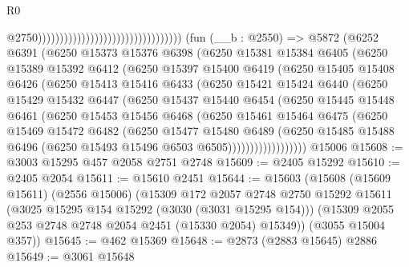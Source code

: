 \begin{lexlean}{R0}
\begin{coremodule}
                                                                      @2750)))))))))))))))))))))))))))))))))
    (fun (__b : @2550) =>
    @5872
      (@6252
        @6391
        (@6250
          @15373
          @15376
          @6398
          (@6250
            @15381
            @15384
            @6405
            (@6250
              @15389
              @15392
              @6412
              (@6250
                @15397
                @15400
                @6419
                (@6250
                  @15405
                  @15408
                  @6426
                  (@6250
                    @15413
                    @15416
                    @6433
                    (@6250
                      @15421
                      @15424
                      @6440
                      (@6250
                        @15429
                        @15432
                        @6447
                        (@6250
                          @15437
                          @15440
                          @6454
                          (@6250
                            @15445
                            @15448
                            @6461
                            (@6250
                              @15453
                              @15456
                              @6468
                              (@6250
                                @15461
                                @15464
                                @6475
                                (@6250
                                  @15469
                                  @15472
                                  @6482
                                  (@6250
                                    @15477
                                    @15480
                                    @6489
                                    (@6250
                                      @15485
                                      @15488
                                      @6496
                                      (@6250 @15493 @15496 @6503 @6505))))))))))))))))))
    @15006
@15608 := @3003 @15295 @457 @2058 @2751 @2748
@15609 := @2405 @15292
@15610 := @2405 @2054
@15611 := @15610 @2451
@15644 := @15603
    (@15608
      (@15609 @15611)
      (@2556 @15006)
      (@15309
        @172
        @2057
        @2748
        @2750
        @15292
        @15611
        (@3025 @15295 @154 @15292 (@3030 (@3031 @15295 @154)))
        (@15309 @2055 @253 @2748 @2748 @2054 @2451 (@15330 @2054) @15349))
      (@3055 @15004 @357))
@15645 := @462 @15369
@15648 := @2873 (@2883 @15645) @2886
@15649 := @3061 @15648

\end{coremodule}
\end{lexlean}
